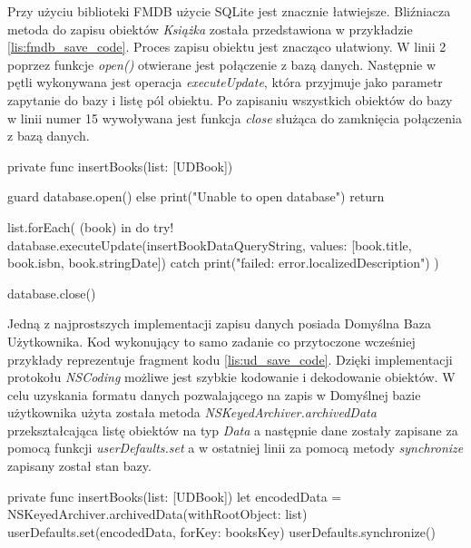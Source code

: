 Przy użyciu biblioteki FMDB użycie SQLite jest znacznie łatwiejsze. Bliźniacza metoda do zapisu obiektów \textit{Książka} została przedstawiona w przykładzie \ref{lis:fmdb_save_code}. Proces zapisu obiektu jest znacząco ułatwiony. W linii 2 poprzez funkcje \textit{open()} otwierane jest połączenie z bazą danych. Następnie w pętli wykonywana jest operacja \textit{executeUpdate}, która przyjmuje jako parametr zapytanie do bazy i listę pól obiektu. Po zapisaniu wszystkich obiektów do bazy w linii numer 15 wywoływana jest funkcja \textit{close} służąca do zamknięcia połączenia z bazą danych. 

\begin{code}[
		language=swift,
		caption={Przykład zapisu obiektu FMDB},
		label={lis:fmdb_save_code},
	]
    private func insertBooks(list: [UDBook]) {
        guard database.open() else {
            print("Unable to open database")
            return
        }
        
        list.forEach({ (book) in
            do {
                try! database.executeUpdate(insertBookDataQueryString, values: [book.title, book.isbn, book.stringDate])
            } catch {
                print("failed: error.localizedDescription")
            }
        })
        
        database.close()
    }
\end{code}

Jedną z najprostszych implementacji zapisu danych posiada Domyślna Baza Użytkownika. Kod wykonujący to samo zadanie co przytoczone wcześniej przykłady reprezentuje fragment kodu \ref{lis:ud_save_code}. Dzięki implementacji protokołu \textit{NSCoding} możliwe jest szybkie kodowanie i dekodowanie obiektów. W celu uzyskania formatu danych pozwalającego na zapis w Domyślnej bazie użytkownika użyta została metoda \textit{NSKeyedArchiver.archivedData} przekształcająca listę obiektów na typ \textit{Data} a następnie dane zostały zapisane za pomocą funkcji \textit{userDefaults.set}  a w ostatniej linii za pomocą metody \textit{synchronize} zapisany został stan bazy. 

\begin{code}[
		language=swift,
		caption={Przykład zapisu obiektu User Defaults},
		label={lis:ud_save_code},
	]
    private func insertBooks(list: [UDBook]) {
        let encodedData = NSKeyedArchiver.archivedData(withRootObject: list)
        userDefaults.set(encodedData, forKey: booksKey)
        userDefaults.synchronize()
    }
\end{code}

